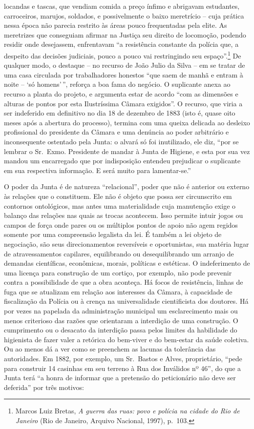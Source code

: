 locandas e tascas, que vendiam comida a preço ínfimo e abrigavam
estudantes, carroceiros, marujos, soldados, e possivelmente o baixo
meretrício -- cuja prática nessa época não parecia restrito às áreas
pouco frequentadas pela elite. As meretrizes que conseguiam afirmar na
Justiça seu direito de locomoção, podendo residir onde desejassem,
enfrentavam ``a resistência constante da polícia que, a despeito das
decisões judiciais, pouco a pouco vai restringindo seu
espaço''.\footnote{Marcos Luiz Bretas, \emph{A guerra das ruas: povo e
  polícia na cidade do Rio de Janeiro} (Rio de Janeiro, Arquivo
  Nacional, 1997), p.~103.} De qualquer modo, o destaque -- no recurso
de João Julio da Silva -- em se tratar de uma casa circulada por
trabalhadores honestos ``que saem de manhã e entram à noite -- `só
homens'\,'', reforça a boa fama do negócio. O suplicante anexa ao
recurso a planta do projeto, e argumenta estar de acordo ``com as
dimensões e alturas de pontos por esta Ilustríssima Câmara exigidos''. O
recurso, que viria a ser indeferido em definitivo no dia 18 de dezembro
de 1883 (isto é, quase oito meses após a abertura do processo), termina
com uma queixa delicada ao desleixo profissional do presidente da Câmara
e uma denúncia ao poder arbitrário e inconsequente ostentado pela Junta:
o alvará só foi inutilizado, ele diz, ``por se lembrar o Sr.~Exmo.
Presidente de mandar à Junta de Higiene, e esta por sua vez mandou um
encarregado que por indisposição entendeu prejudicar o suplicante em sua
respectiva informação. E será muito para lamentar-se.''

O poder da Junta é de natureza ``relacional'', poder que não é anterior
ou externo às relações que o constituem. Ele não é objeto que possa ser
circunscrito em contornos ontológicos, mas antes uma materialidade cuja
manutenção exige o balanço das relações nas quais as trocas acontecem.
Isso permite intuir jogos ou campos de força onde pares ou os múltiplos
pontos de apoio não agem regidos somente por uma compreensão legalista
da lei. É também a lei objeto de negociação, são seus direcionamentos
reversíveis e oportunistas, sua matéria lugar de atravessamentos
capilares, equilibrando ou desequilibrando um arranjo de demandas
científicas, econômicas, morais, políticas e estéticas. O indeferimento
de uma licença para construção de um cortiço, por exemplo, não pode
prevenir contra a possibilidade de que a obra aconteça. Há focos de
resistência, linhas de fuga que se atualizam em relação aos interesses
da Câmara, à capacidade de fiscalização da Polícia ou à crença na
universalidade cientificista dos doutores. Há por vezes na papelada da
administração municipal um esclarecimento mais ou menos criterioso das
razões que orientaram a interdição de uma construção. O cumprimento ou o
desacato da interdição passa pelos limites da habilidade do higienista
de fazer valer a retórica do bem-viver e do bem-estar da saúde coletiva.
Ou ao menos dá a ver como se preenchem as lacunas da tolerância das
autoridades. Em 1882, por exemplo, um Sr.~Bastos e Alves, proprietário,
``pede para construir 14 casinhas em seu terreno à Rua dos Inválidos nº
46'', do que a Junta terá ``a honra de informar que a pretensão do
peticionário não deve ser deferida'' por três motivos:

